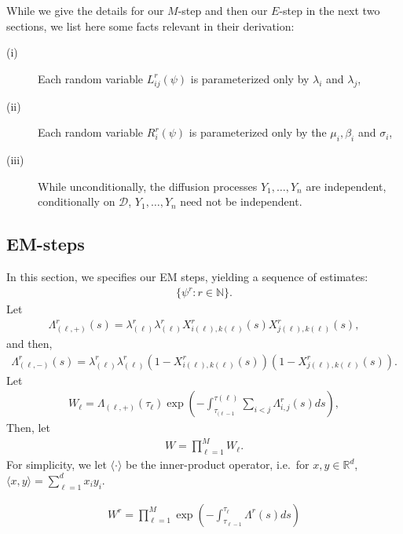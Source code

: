 \documentclass[12pt]{article}%
\begin{document}
While we give the details for our $M$-step and then our $E$-step in the next two sections, 
we list here some facts relevant in their derivation:
\begin{description}
\item[(i)] Each random variable $L_{ij}^r(\psi)$ is parameterized only by $\lambda_i$ and $\lambda_j$, 
\item[(ii)] Each random variable $R_{i}^r(\psi)$ is parameterized only by the $\mu_i, \beta_i$ and $\sigma_i$,
\item[(iii)] While unconditionally, the diffusion processes $Y_1,\ldots, Y_n$ are independent,
conditionally on $\mathcal D$, $Y_1,\ldots,Y_n$ need not be independent.
\end{description}

\subsection{EM-steps}
In this section, we specifies our EM steps, yielding a sequence of estimates:
\begin{eqnarray}
\{\psi^r: r \in \mathbb N\}.
\end{eqnarray}
Let
\begin{eqnarray}
\Lambda_{(\ell,+)}^r(s)
=
\lambda_{(\ell)}^r \lambda_{(\ell)}^r X_{i(\ell),k(\ell)}^r(s)X_{j(\ell),k(\ell)}^r(s),
\end{eqnarray}
and then, 
\begin{eqnarray}
\Lambda_{(\ell,-)}^r(s)
=
\lambda_{(\ell)}^r \lambda_{(\ell)}^r (1-X_{i(\ell),k(\ell)}^r(s))(1-X_{j(\ell),k(\ell)}^r(s)).
\end{eqnarray}
Let 
\begin{eqnarray}
W_\ell = \Lambda_{(\ell,+)}(\tau_\ell) \exp\left(-\int_{\tau_{(\ell-1}}^{\tau(\ell)} \sum_{i<j} \Lambda_{i,j}^r(s) ds\right),  
\end{eqnarray}
Then, let 
\begin{eqnarray}
W = \prod_{\ell=1}^M W_{\ell}.
\end{eqnarray}
For simplicity, we let $\langle \cdot \rangle$ be the inner-product operator, i.e.\ for $x,y\in\mathbb R^d$, $\langle x, y \rangle = \sum_{\ell=1}^d x_i y_i$.   

\begin{eqnarray}
W^r = \prod_{\ell=1}^{M} \exp\left(-\int_{\tau_{\ell-1}}^{\tau_\ell} \Lambda^r(s) ds\right)
\end{eqnarray}
\end{document}
